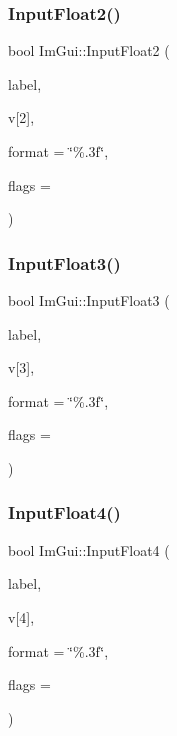 \subsubsection{\texorpdfstring{Input\+Float2()}{InputFloat2()}}
{\footnotesize\ttfamily bool Im\+Gui\+::\+Input\+Float2 (\begin{DoxyParamCaption}\item[{const char $\ast$}]{label,  }\item[{float}]{v\mbox{[}2\mbox{]},  }\item[{const char $\ast$}]{format = {\ttfamily \char`\"{}\%.3f\char`\"{}},  }\item[{Im\+Gui\+Input\+Text\+Flags}]{flags = {} }\end{DoxyParamCaption})}

\mbox{\label{namespaceImGui_a970a00fd1a4226c697ea5fb807fb62d8}} 
\subsubsection{\texorpdfstring{Input\+Float3()}{InputFloat3()}}
{\footnotesize\ttfamily bool Im\+Gui\+::\+Input\+Float3 (\begin{DoxyParamCaption}\item[{const char $\ast$}]{label,  }\item[{float}]{v\mbox{[}3\mbox{]},  }\item[{const char $\ast$}]{format = {\ttfamily \char`\"{}\%.3f\char`\"{}},  }\item[{Im\+Gui\+Input\+Text\+Flags}]{flags = {} }\end{DoxyParamCaption})}

\mbox{\label{namespaceImGui_a69675d2e9780a0e5a7a372f936b64d49}} 
\subsubsection{\texorpdfstring{Input\+Float4()}{InputFloat4()}}
{\footnotesize\ttfamily bool Im\+Gui\+::\+Input\+Float4 (\begin{DoxyParamCaption}\item[{const char $\ast$}]{label,  }\item[{float}]{v\mbox{[}4\mbox{]},  }\item[{const char $\ast$}]{format = {\ttfamily \char`\"{}\%.3f\char`\"{}},  }\item[{Im\+Gui\+Input\+Text\+Flags}]{flags = {} }\end{DoxyParamCaption})}

